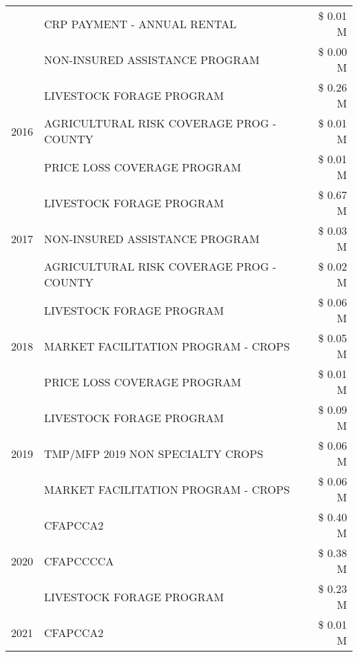 \begin{tabular}{llr}
 & CRP PAYMENT - ANNUAL RENTAL & \$ 0.01 M \\
 & NON-INSURED ASSISTANCE PROGRAM & \$ 0.00 M \\
\cline{1-3}
\multirow[t]{3}{*}{2016} & LIVESTOCK FORAGE PROGRAM & \$ 0.26 M \\
 & AGRICULTURAL RISK COVERAGE PROG - COUNTY & \$ 0.01 M \\
 & PRICE LOSS COVERAGE PROGRAM & \$ 0.01 M \\
\cline{1-3}
\multirow[t]{3}{*}{2017} & LIVESTOCK FORAGE PROGRAM & \$ 0.67 M \\
 & NON-INSURED ASSISTANCE PROGRAM & \$ 0.03 M \\
 & AGRICULTURAL RISK COVERAGE PROG - COUNTY & \$ 0.02 M \\
\cline{1-3}
\multirow[t]{3}{*}{2018} & LIVESTOCK FORAGE PROGRAM & \$ 0.06 M \\
 & MARKET FACILITATION PROGRAM - CROPS & \$ 0.05 M \\
 & PRICE LOSS COVERAGE PROGRAM & \$ 0.01 M \\
\cline{1-3}
\multirow[t]{3}{*}{2019} & LIVESTOCK FORAGE PROGRAM & \$ 0.09 M \\
 & TMP/MFP 2019 NON SPECIALTY CROPS & \$ 0.06 M \\
 & MARKET FACILITATION PROGRAM - CROPS & \$ 0.06 M \\
\cline{1-3}
\multirow[t]{3}{*}{2020} & CFAPCCA2 & \$ 0.40 M \\
 & CFAPCCCCA & \$ 0.38 M \\
 & LIVESTOCK FORAGE PROGRAM & \$ 0.23 M \\
\cline{1-3}
2021 & CFAPCCA2 & \$ 0.01 M \\
\cline{1-3}
\bottomrule
\end{tabular}
